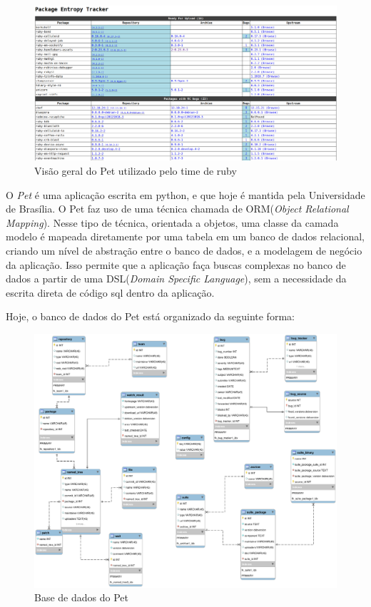 \begin{figure}[h]
	\centering
	\label{fig01}
        \includegraphics[scale=0.25]{figuras/pet1.eps}
	\caption{Visão geral do Pet utilizado pelo time de ruby}
\end{figure}

O \textit{Pet} é uma aplicação escrita em python, e que hoje é mantida pela Universidade de Brasília. O Pet faz uso de uma técnica chamada de ORM(\textit{Object Relational Mapping}). 
Nesse tipo de técnica, orientada a objetos, uma classe da camada modelo é mapeada diretamente por uma tabela em um banco de dados relacional, criando um nível de abstração entre o banco de dados, e a modelagem de negócio da aplicação.
Isso permite que a aplicação faça buscas complexas no banco de dados a partir de uma DSL(\textit{Domain Specific Language}), sem a necessidade da escrita direta de código sql dentro da aplicação.

Hoje, o banco de dados do Pet está organizado da seguinte forma:
\begin{figure}[h]
	\centering
	\label{fig01}
        \includegraphics[scale=0.33]{figuras/base1.eps}
	\caption{Base de dados do Pet}
\end{figure}


